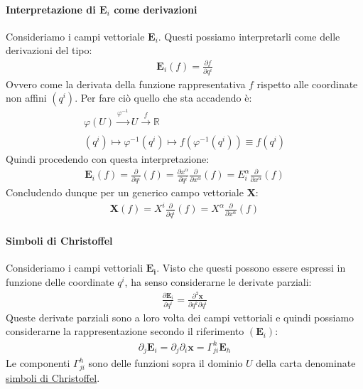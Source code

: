 \paragraph{Interpretazione di $\mathbf{E}_i$ come derivazioni} Consideriamo i campi vettoriale $\mathbf{E}_i$. Questi possiamo interpretarli come delle derivazioni del tipo:
\begin{align*}
    \mathbf{E}_i(f)=\frac{\partial f}{\partial q^i}
\end{align*}
Ovvero come la derivata della funzione rappresentativa $f$ rispetto alle coordinate non affini $(q^i)$. Per fare ciò quello che sta accadendo è:
\begin{align*}
    \varphi (U)\xrightarrow[]{\varphi^{-1}} U\xrightarrow[]{f} \mathbb{R}\\
    (q^i)\mapsto\varphi^{-1}(q^i)\mapsto f(\varphi^{-1}(q^i))\equiv f(q^i)
\end{align*}
Quindi procedendo con questa interpretazione:
\begin{align*}
    \mathbf{E}_i(f)=\frac{\partial}{\partial q^i}(f)=\frac{\partial x^\alpha}{\partial q^i}\frac{\partial}{\partial x^\alpha}(f)=E^\alpha_i\frac{\partial}{\partial x^\alpha}(f)
\end{align*}
Concludendo dunque per un generico campo vettoriale $\mathbf{X}$:
\begin{align*}
    \mathbf{X}(f)=X^i\frac{\partial}{\partial q^i}(f)=X^\alpha \frac{\partial}{\partial x^\alpha}(f)
\end{align*}
\paragraph{Simboli di Christoffel} Consideriamo i campi vettoriali $\mathbf{E_i}$. Visto che questi possono essere espressi in funzione delle coordinate $q^i$, ha senso considerarne le derivate parziali:
\begin{align*}
    \frac{\partial \mathbf{E}_i}{\partial q^i}=\frac{\partial^2\mathbf{x}}{\partial q^k\partial q^i}
\end{align*}
Queste derivate parziali sono a loro volta dei campi vettoriali e quindi possiamo considerarne la rappresentazione secondo il riferimento $(\mathbf{E}_i)$:
\begin{align*}
    \partial_j\mathbf{E}_i=\partial_j\partial_i\mathbf{x}=\Gamma^h_{ji}\mathbf{E}_h
\end{align*}
Le componenti $\Gamma^h_{ji}$ sono delle funzioni sopra il dominio $U$ della carta denominate \underline{simboli di Christoffel}.
